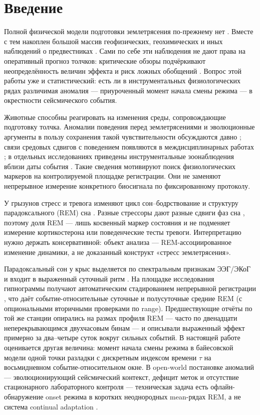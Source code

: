 \section{Введение}

Полной физической модели подготовки землетрясения по-прежнему нет \cite{Rodkin2011}. Вместе с тем накоплен большой массив геофизических, геохимических и иных наблюдений о предвестниках \cite{Cicerone2009,Conti2021}. Сами по себе эти наблюдения не дают права на оперативный прогноз толчков: критические обзоры подчёркивают неопределённость величин эффекта и риск ложных обобщений \cite{Geller1997,Conti2021}. Вопрос этой работы уже и статистический: есть ли в инструментальных физиологических рядах различимая аномалия — приуроченный момент начала смены режима — в окрестности сейсмического события.

Животные способны реагировать на изменения среды, сопровождающие подготовку толчка. Аномалии поведения перед землетрясениями и эволюционные аргументы в пользу сохранения такой чувствительности обсуждаются давно \cite{Kirschvink2000}; связи средовых сдвигов с поведением появляются в междисциплинарных работах \cite{Grant2011}; в отдельных исследованиях приведены инструментальные зоонаблюдения вблизи даты события \cite{Yokoi2003}. Такие сведения мотивируют поиск физиологических маркеров на контролируемой площадке регистрации. Они не заменяют непрерывное измерение конкретного биосигнала по фиксированному протоколу.

У грызунов стресс и тревога изменяют цикл сон–бодрствование и структуру парадоксального (REM) сна \cite{Rampin1991,Meerlo1997,Palma2000,Sanford2003}. Разные стрессоры дают разные сдвиги фаз сна \cite{Rampin1991,Meerlo1997,Palma2000}, поэтому доля REM — лишь косвенный маркер состояния и не подменяет измерение кортикостерона или поведенческие тесты тревоги. Интерпретацию нужно держать консервативной: объект анализа — REM-ассоциированное изменение динамики, а не доказанный конструкт «стресс землетрясения».

Парадоксальный сон у крыс выделяется по спектральным признакам ЭЭГ/ЭКоГ и входит в выраженный суточный ритм \cite{Fang2010,Vyazovskiy2005}. На площадке исследования гипнограммы получают автоматическим стадированием непрерывной регистрации \cite{Saevskiy2025}, что даёт событие-относительные суточные и полусуточные средние REM (с опциональными вторичными проверками по range). Предшествующие отчёты по той же станции опирались на размах профиля REM — часто по двенадцати неперекрывающимся двухчасовым бинам — и описывали выраженный эффект примерно за два–четыре суток вокруг сильных событий. В настоящей работе оценивается другая величина: момент начала смены режима в байесовской модели одной точки разладки с дискретным индексом времени \(\tau\) на восьмидневном событие-относительном окне. В open-world постановке аномалий — эволюционирующий сейсмический контекст, дефицит меток и отсутствие стационарного лабораторного контроля \cite{Chandola2009,Gama2014,Han2023} — техническая задача есть офлайн-обнаружение onset режима в коротких неоднородных mean-рядах REM, а не система continual adaptation \cite{Faber2024}.

